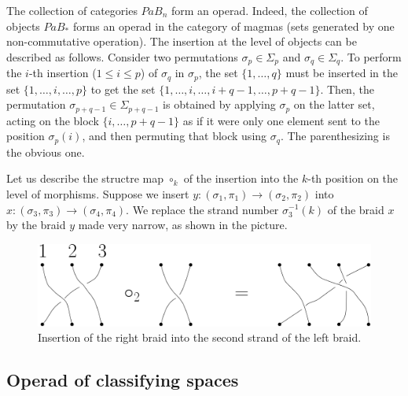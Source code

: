 \documentclass[TFM.tex]{subfiles}
\begin{document}

The collection of categories $PaB_n$ form an operad. Indeed, the collection of objects $PaB_*$ forms an operad in the category of magmas (sets generated by one non-commutative operation). The insertion at the level of objects can be described as follows. Consider two permutations $\sigma_p\in\Sigma_p$ and $\sigma_q\in\Sigma_q$. To perform the $i$-th insertion ($1\leq i\leq p$) of $\sigma_q$ in $\sigma_p$, the set $\{1,\dots, q\}$ must be inserted in the set $\{1,\dots, i,\dots, p\}$ to get the set $\{1,\dots, i,\dots,i+q-1,\dots, p+q-1\}$. Then, the permutation $\sigma_{p+q-1}\in\Sigma_{p+q-1}$ is obtained by applying $\sigma_p$ on the latter set, acting on the block $\{i,\dots, p+q-1\}$ as if it were only one element sent to the position $\sigma_p(i)$, and then permuting that block using $\sigma_q$. The parenthesizing is the obvious one. 

Let us describe the structre map $\circ_k$ of the insertion into the $k$-th position on the level of morphisms. Suppose we insert $y:(\sigma_1,\pi_1)\to (\sigma_2,\pi_2)$ into $x:(\sigma_3,\pi_3)\to(\sigma_4,\pi_4)$. We replace the strand number $\sigma^{-1}_3(k)$ of the braid $x$ by the braid $y$ made very narrow, as shown in the picture.

\begin{figure}[h!]
\includegraphics[scale=0.7]{Imagenes/insercion.png}
\caption{Insertion of the right braid into the second strand of the left braid.}
\end{figure}

\subsection{Operad of classifying spaces}
\end{document}

